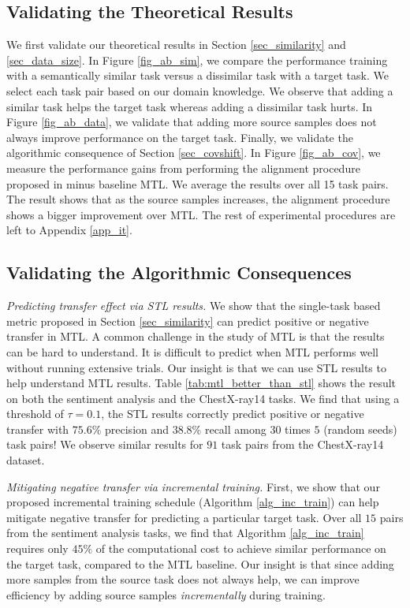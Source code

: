 \subsection{Validating the Theoretical Results}\label{sec_exp_ab}

We first validate our theoretical results in Section \ref{sec_similarity} and \ref{sec_data_size}.
In Figure \ref{fig_ab_sim}, we compare the performance training with a semantically similar task versus a dissimilar task with a target task.
We select each task pair based on our domain knowledge.
We observe that adding a similar task helps the target task whereas adding a dissimilar task hurts.
In Figure \ref{fig_ab_data}, we validate that adding more source samples does not always improve performance on the target task.
Finally, we validate the algorithmic consequence of Section \ref{sec_covshift}.
In Figure \ref{fig_ab_cov}, we measure the performance gains from performing the alignment procedure proposed in \cite{WZR20} minus baseline MTL.
We average the results over all 15 task pairs.
The result shows that as the source samples increases, the alignment procedure shows a bigger improvement over MTL.
The rest of experimental procedures are left to Appendix \ref{app_it}.



\subsection{Validating the Algorithmic Consequences}\label{sec_exp_res}

\textit{Predicting transfer effect via STL results.}
We show that the single-task based metric proposed in Section \ref{sec_similarity} can predict positive or negative transfer in MTL.
A common challenge in the study of MTL is that the results can be hard to understand.
It is difficult to predict when MTL performs well without running extensive trials.
Our insight is that we can use STL results to help understand MTL results.
Table \ref{tab:mtl_better_than_stl} shows the result on both the sentiment analysis and the ChestX-ray14 tasks.
We find that using a threshold of $\tau = 0.1$, the STL results correctly predict positive or negative transfer with $75.6\%$ precision and $38.8\%$ recall among $30$ times $5$ (random seeds) task pairs!
We observe similar results for $91$ task pairs from the ChestX-ray14 dataset.

\textit{Mitigating negative transfer via incremental training.}
First, we show that our proposed incremental training schedule (Algorithm \ref{alg_inc_train}) can help mitigate negative transfer for predicting a particular target task.
Over all $15$ pairs from the sentiment analysis tasks, we find that Algorithm \ref{alg_inc_train} requires only $45\%$ of the computational cost to achieve similar performance on the target task, compared to the MTL baseline.
Our insight is that since adding more samples from the source task does not always help, we can improve efficiency by adding source samples \textit{incrementally} during training.

